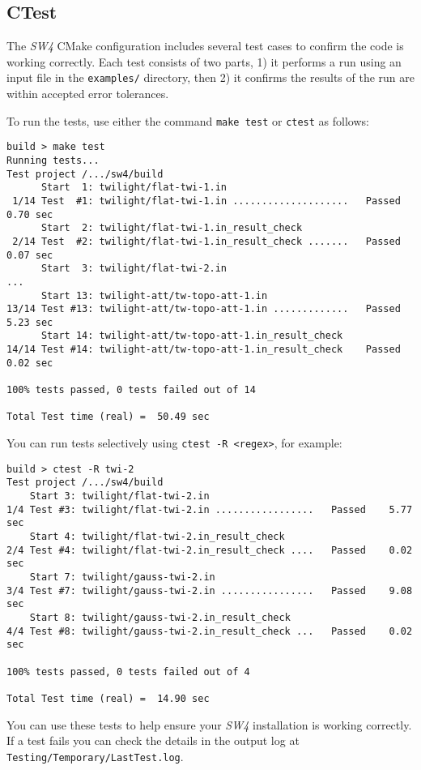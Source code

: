 \documentclass[11pt]{article}
\begin{document}
\subsection{CTest}
The \emph{SW4} CMake configuration includes several test cases to confirm the code is working correctly.  Each test consists of two parts, 1) it performs a run using an input file in the \verb+examples/+ directory, then 2) it confirms the results of the run are within accepted error tolerances.

To run the tests, use either the command \texttt{make test} or \texttt{ctest} as follows:

\begin{verbatim}
build > make test
Running tests...
Test project /.../sw4/build
      Start  1: twilight/flat-twi-1.in
 1/14 Test  #1: twilight/flat-twi-1.in ....................   Passed    0.70 sec
      Start  2: twilight/flat-twi-1.in_result_check
 2/14 Test  #2: twilight/flat-twi-1.in_result_check .......   Passed    0.07 sec
      Start  3: twilight/flat-twi-2.in
...
      Start 13: twilight-att/tw-topo-att-1.in
13/14 Test #13: twilight-att/tw-topo-att-1.in .............   Passed    5.23 sec
      Start 14: twilight-att/tw-topo-att-1.in_result_check
14/14 Test #14: twilight-att/tw-topo-att-1.in_result_check    Passed    0.02 sec

100% tests passed, 0 tests failed out of 14

Total Test time (real) =  50.49 sec
\end{verbatim}

You can run tests selectively using \texttt{ctest -R \textless regex\textgreater}, for example:

\begin{verbatim}
build > ctest -R twi-2
Test project /.../sw4/build
    Start 3: twilight/flat-twi-2.in
1/4 Test #3: twilight/flat-twi-2.in .................   Passed    5.77 sec
    Start 4: twilight/flat-twi-2.in_result_check
2/4 Test #4: twilight/flat-twi-2.in_result_check ....   Passed    0.02 sec
    Start 7: twilight/gauss-twi-2.in
3/4 Test #7: twilight/gauss-twi-2.in ................   Passed    9.08 sec
    Start 8: twilight/gauss-twi-2.in_result_check
4/4 Test #8: twilight/gauss-twi-2.in_result_check ...   Passed    0.02 sec

100% tests passed, 0 tests failed out of 4

Total Test time (real) =  14.90 sec
\end{verbatim}

You can use these tests to help ensure your \emph{SW4} installation is working correctly.  If a test fails you can check the details in the output log at \texttt{Testing/Temporary/LastTest.log}.
\end{document}
